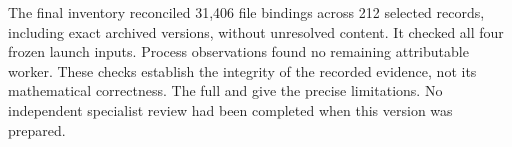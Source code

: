 The final inventory reconciled 31,406 file bindings across 212 selected
records, including exact archived versions, without unresolved content.
It checked all four frozen launch inputs. Process observations found no
remaining attributable worker. These checks establish the integrity of
the recorded evidence, not its mathematical correctness. The full
 and
 give the precise
limitations. No independent specialist review had been completed when
this version was prepared.

